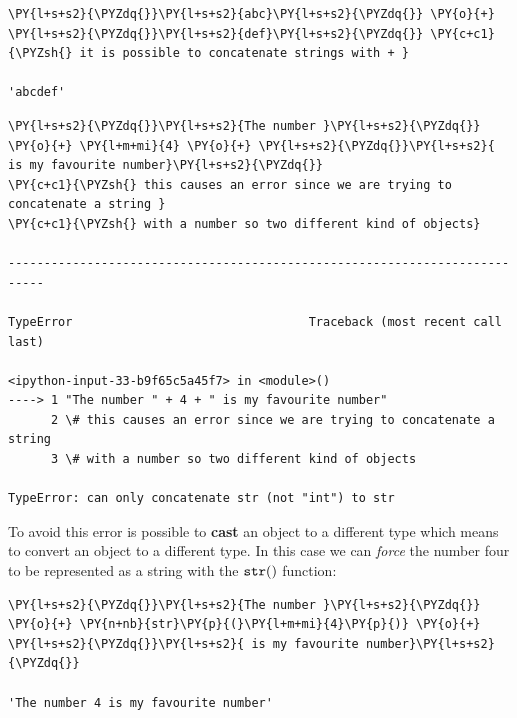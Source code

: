 \begin{tcolorbox}[breakable, size=fbox, boxrule=1pt, pad at break*=1mm, colback=cellbackground, colframe=cellborder]            
\begin{Verbatim}[commandchars=\\\{\}]
\PY{l+s+s2}{\PYZdq{}}\PY{l+s+s2}{abc}\PY{l+s+s2}{\PYZdq{}} \PY{o}{+} \PY{l+s+s2}{\PYZdq{}}\PY{l+s+s2}{def}\PY{l+s+s2}{\PYZdq{}} \PY{c+c1}{\PYZsh{} it is possible to concatenate strings with + }

'abcdef'
\end{Verbatim}
\end{tcolorbox}

\begin{tcolorbox}[breakable, size=fbox, boxrule=1pt, pad at break*=1mm, colback=cellbackground, colframe=cellborder]            
\begin{Verbatim}[commandchars=\\\{\}]
\PY{l+s+s2}{\PYZdq{}}\PY{l+s+s2}{The number }\PY{l+s+s2}{\PYZdq{}} \PY{o}{+} \PY{l+m+mi}{4} \PY{o}{+} \PY{l+s+s2}{\PYZdq{}}\PY{l+s+s2}{ is my favourite number}\PY{l+s+s2}{\PYZdq{}}
\PY{c+c1}{\PYZsh{} this causes an error since we are trying to concatenate a string }
\PY{c+c1}{\PYZsh{} with a number so two different kind of objects}

---------------------------------------------------------------------------

TypeError                                 Traceback (most recent call last)

<ipython-input-33-b9f65c5a45f7> in <module>()
----> 1 "The number " + 4 + " is my favourite number"
      2 \# this causes an error since we are trying to concatenate a string
      3 \# with a number so two different kind of objects

TypeError: can only concatenate str (not "int") to str
\end{Verbatim}
\end{tcolorbox}

To avoid this error is possible to \textbf{cast} an object to a different type which means to convert an object to a different type. In this case we can \emph{force} the number four to be represented as a string with the \(\tt{str()}\) function:

\begin{tcolorbox}[breakable, size=fbox, boxrule=1pt, pad at break*=1mm, colback=cellbackground, colframe=cellborder]            
\begin{Verbatim}[commandchars=\\\{\}]
\PY{l+s+s2}{\PYZdq{}}\PY{l+s+s2}{The number }\PY{l+s+s2}{\PYZdq{}} \PY{o}{+} \PY{n+nb}{str}\PY{p}{(}\PY{l+m+mi}{4}\PY{p}{)} \PY{o}{+} \PY{l+s+s2}{\PYZdq{}}\PY{l+s+s2}{ is my favourite number}\PY{l+s+s2}{\PYZdq{}}

'The number 4 is my favourite number'
\end{Verbatim}
\end{tcolorbox}

